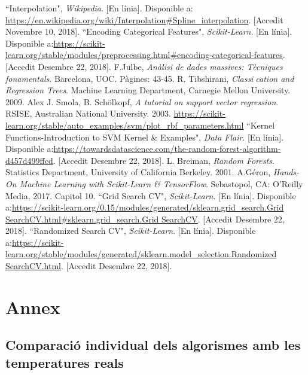 \documentclass[10pt,a4paper,twocolumn,twoside]{article}
\begin{document}
\begin{thebibliography}{11}
 ``Interpolation", \textit{Wikipedia}. [En línia]. Disponible a: \url{https://en.wikipedia.org/wiki/Interpolation#Spline_interpolation}. [Accedit Novembre 10, 2018].
``Encoding Categorical Features", \textit{Scikit-Learn}. [En línia]. Disponible a:\url{https://scikit-learn.org/stable/modules/preprocessing.html#encoding-categorical-features}. [Accedit Desembre 22, 2018].
F.Julbe, \textit{Anàlisi de dades massives: Tècniques fonamentals}. Barcelona, UOC. Pàgines: 43-45.
R. Tibshirani, \textit{Classication and Regression Trees}. Machine Learning Department, Carnegie Mellon University. 2009.
Alex J. Smola, B. Schölkopf, \textit{A tutorial on support vector regression}. RSISE, Australian National University. 2003.
\url{https://scikit-learn.org/stable/auto_examples/svm/plot_rbf_parameters.html}
``Kernel Functions-Introduction to SVM Kernel \& Examples", \textit{Data Flair}. [En línia]. Disponible a:\url{https://towardsdatascience.com/the-random-forest-algorithm-d457d499ffcd}. [Accedit Desembre 22, 2018].
L. Breiman, \textit{Random Forests}. Statistics Department, University of California Berkeley. 2001.
A.Géron, \textit{Hands-On Machine Learning with Scikit-Learn \& TensorFlow}. Sebastopol, CA: O’Reilly Media, 2017. Capitol 10.
``Grid Search CV", \textit{Scikit-Learn}. [En línia]. Disponible a:\url{https://scikit-learn.org/0.15/modules/generated/sklearn.grid_search.Grid SearchCV.html#sklearn.grid_search.Grid SearchCV}. [Accedit Desembre 22, 2018].
``Randomized Search CV", \textit{Scikit-Learn}. [En línia]. Disponible a:\url{https://scikit-learn.org/stable/modules/generated/sklearn.model_selection.Randomized SearchCV.html}. [Accedit Desembre 22, 2018].

\end{thebibliography}
\clearpage
\section{Annex}

\subsection{Comparació individual dels algorismes amb les temperatures reals}
\end{document}
